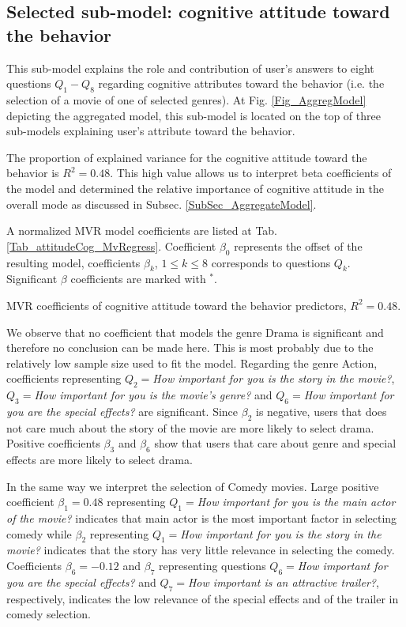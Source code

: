 \documentclass{llncs}
\def\b{{\beta}}
\begin{document}
\subsection{Selected sub-model: cognitive attitude toward the behavior}\label{SubSec_CogAttr}

This sub-model explains the role and contribution of user's answers to eight questions $Q_1 - Q_8$ regarding cognitive attributes toward the behavior (i.e. the selection of a movie of one of selected genres). At Fig. \ref{Fig_AggregModel} depicting the aggregated model, this sub-model is located on the top of three sub-models explaining user's attribute toward the behavior.

The proportion of explained variance for the cognitive attitude toward the behavior is $R^2=0.48$. This high value allows us to interpret beta coefficients of the model and determined the relative importance of cognitive attitude in the overall mode as discussed  in Subsec. \ref{SubSec_AggregateModel}.

A normalized MVR model coefficients are listed at Tab. \ref{Tab_attitudeCog_MvRegress}. Coefficient $\b_0$ 
represents the offset of the resulting model, coefficients $\b_k$, $1\leq k \leq 8$ corresponds to questions $Q_k$. Significant $\b$ coefficients are marked with $^*$. 
\begin{table}[!h]
  \centering
   
  \caption{MVR coefficients of cognitive attitude toward the behavior predictors, $R^2 = 0.48$.}
  \label{Tab_attitudeCog_MvRegress}
\end{table}
We observe that no coefficient that models the genre Drama is significant and therefore no conclusion can be made here. This is most probably due to the relatively low sample size used to fit the model. Regarding the genre Action, coefficients representing $Q_2=${\it How important for you is the story in the movie?}, $Q_3=${\it How important for you is the movie's genre?} and $Q_6=${\it How important for you are the special effects?} are significant. Since $\b_2$ is negative, users that does not care much about the story of the movie are more likely to select drama. Positive coefficients $\b_3$ and $\b_6$ show that users that care about genre and special effects are more likely to select drama. 

In the same way we interpret the selection of Comedy movies. Large positive coefficient $\b_1=0.48$ representing $Q_1=${\it How important for you is the main actor of the movie?} indicates that main actor is the most important factor in selecting comedy while $\b_2$ representing $Q_1=${\it How important for you is the story in the movie?} indicates that the story has very little relevance in selecting the comedy. Coefficients $\b_6=-0.12$ and $\b_7$ representing questions $Q_6=${\it How important for you are the special effects?} and $Q_7=${\it How important is an attractive trailer?}, respectively, indicates the low relevance of the special effects and of the trailer in comedy selection. 
\end{document}
